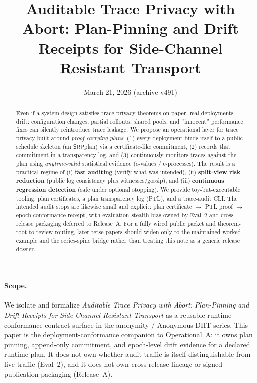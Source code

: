\documentclass[11pt]{article}
\title{Auditable Trace Privacy with Abort: Plan-Pinning and Drift Receipts for Side-Channel Resistant Transport}
\author{}
\date{March 21, 2026 (archive v491)}
\newcommand{\SRP}{\ensuremath{\mathsf{SRP}}}
\begin{document}
\maketitle

\begin{abstract}
Even if a system design satisfies trace-privacy theorems on paper, real deployments drift:
configuration changes, partial rollouts, shared pools, and ``innocent'' performance fixes can silently reintroduce trace leakage.
We propose an operational layer for trace privacy built around \emph{proof-carrying plans}:
(1) every deployment binds itself to a public schedule skeleton (an \SRP plan) via a certificate-like commitment,
(2) records that commitment in a transparency log, and
(3) continuously monitors traces against the plan using \emph{anytime-valid} statistical evidence (e-values / e-processes).
The result is a practical regime of (i) \textbf{fast auditing} (verify what was intended),
(ii) \textbf{split-view risk reduction} (public log consistency plus witnesses/gossip), and
(iii) \textbf{continuous regression detection} (safe under optional stopping).
We provide toy-but-executable tooling: plan certificates, a plan transparency log (PTL), and a trace-audit CLI.
The intended audit stops are likewise small and explicit: plan certificate $\rightarrow$ PTL proof $\rightarrow$ epoch conformance receipt, with evaluation-stealth bias owned by Eval~2 and cross-release packaging deferred to Release~A. For a fully wired public packet and theorem-root-to-review routing, later terse papers should widen only to the maintained worked example and the series-spine bridge rather than treating this note as a generic release dossier.\cite{series:workedexample,series:seriesspines}
\end{abstract}

\paragraph{Scope.}
We isolate and formalize \emph{Auditable Trace Privacy with Abort: Plan-Pinning and Drift Receipts for Side-Channel Resistant Transport} as a reusable runtime-conformance contract surface in the anonymity / Anonymous-DHT series.
This paper is the deployment-conformance companion to Operational~A: it owns plan pinning, append-only commitment, and epoch-level drift evidence for a declared runtime plan.
It does not own whether audit traffic is itself distinguishable from live traffic (Eval~2), and it does not own cross-release lineage or signed publication packaging (Release~A).
\end{document}
